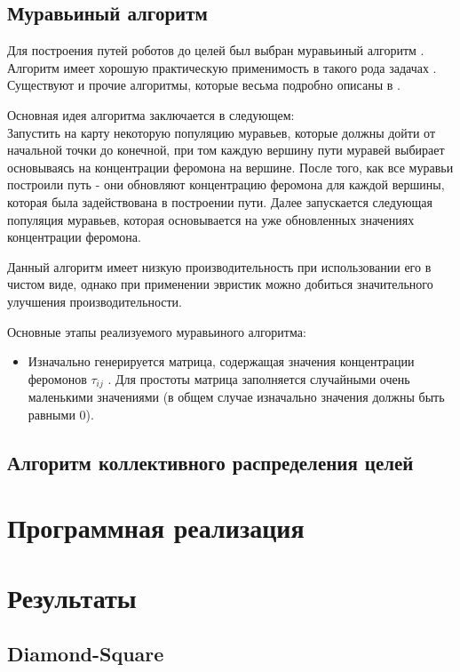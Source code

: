 \documentclass{article}
\numberwithin{equation}{section}
\begin{document}
		\subsection{Муравьиный алгоритм}

			Для построения путей роботов до целей был выбран муравьиный алгоритм \cite{ant}. Алгоритм имеет хорошую практическую применимость в такого рода задачах \cite{ant}\cite{ant1}\cite{ant2}. Существуют и прочие алгоритмы, которые весьма подробно описаны в \cite{path}.

			Основная идея алгоритма заключается в следующем:\\ Запустить на карту некоторую популяцию муравьев, которые должны дойти от начальной точки до конечной, при том каждую вершину пути муравей выбирает основываясь на концентрации феромона на вершине. После того, как все муравьи построили путь - они обновляют концентрацию феромона для каждой вершины, которая была задействована в построении пути. Далее запускается следующая популяция муравьев, которая основывается на уже обновленных значениях концентрации феромона.

			Данный алгоритм имеет низкую производительность при использовании его в чистом виде, однако при применении эвристик можно добиться значительного улучшения производительности.

			Основные этапы реализуемого муравьиного алгоритма:
			\begin{itemize}
				\item Изначально генерируется матрица, содержащая значения концентрации феромонов $\tau_{ij}$  . Для простоты матрица заполняется случайными очень маленькими значениями (в общем случае изначально значения должны быть равными 0).
			\end{itemize}
		\subsection{Алгоритм коллективного распределения целей}

    \newpage
	\section{Программная реализация}

	\newpage
	\section{Результаты}

		\subsection{Diamond-Square}
\end{document}
